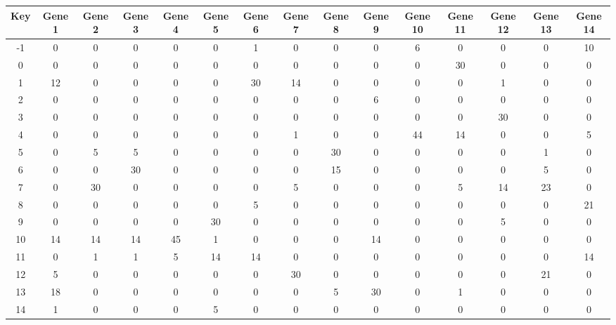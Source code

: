 \begin{tabular}{|c|c|c|c|c|c|c|c|c|c|c|c|c|c|c|}
\hline
Key & Gene 1 & Gene 2 & Gene 3 & Gene 4 & Gene 5 & Gene 6 & Gene 7 & Gene 8 & Gene 9 & Gene 10 & Gene 11 & Gene 12 & Gene 13 & Gene 14 \\
\hline
-1 & 0 & 0 & 0 & 0 & 0 & 1 & 0 & 0 & 0 & 6 & 0 & 0 & 0 & 10 \\
0 & 0 & 0 & 0 & 0 & 0 & 0 & 0 & 0 & 0 & 0 & 30 & 0 & 0 & 0 \\
1 & 12 & 0 & 0 & 0 & 0 & 30 & 14 & 0 & 0 & 0 & 0 & 1 & 0 & 0 \\
2 & 0 & 0 & 0 & 0 & 0 & 0 & 0 & 0 & 6 & 0 & 0 & 0 & 0 & 0 \\
3 & 0 & 0 & 0 & 0 & 0 & 0 & 0 & 0 & 0 & 0 & 0 & 30 & 0 & 0 \\
4 & 0 & 0 & 0 & 0 & 0 & 0 & 1 & 0 & 0 & 44 & 14 & 0 & 0 & 5 \\
5 & 0 & 5 & 5 & 0 & 0 & 0 & 0 & 30 & 0 & 0 & 0 & 0 & 1 & 0 \\
6 & 0 & 0 & 30 & 0 & 0 & 0 & 0 & 15 & 0 & 0 & 0 & 0 & 5 & 0 \\
7 & 0 & 30 & 0 & 0 & 0 & 0 & 5 & 0 & 0 & 0 & 5 & 14 & 23 & 0 \\
8 & 0 & 0 & 0 & 0 & 0 & 5 & 0 & 0 & 0 & 0 & 0 & 0 & 0 & 21 \\
9 & 0 & 0 & 0 & 0 & 30 & 0 & 0 & 0 & 0 & 0 & 0 & 5 & 0 & 0 \\
10 & 14 & 14 & 14 & 45 & 1 & 0 & 0 & 0 & 14 & 0 & 0 & 0 & 0 & 0 \\
11 & 0 & 1 & 1 & 5 & 14 & 14 & 0 & 0 & 0 & 0 & 0 & 0 & 0 & 14 \\
12 & 5 & 0 & 0 & 0 & 0 & 0 & 30 & 0 & 0 & 0 & 0 & 0 & 21 & 0 \\
13 & 18 & 0 & 0 & 0 & 0 & 0 & 0 & 5 & 30 & 0 & 1 & 0 & 0 & 0 \\
14 & 1 & 0 & 0 & 0 & 5 & 0 & 0 & 0 & 0 & 0 & 0 & 0 & 0 & 0 \\
\hline
\end{tabular}